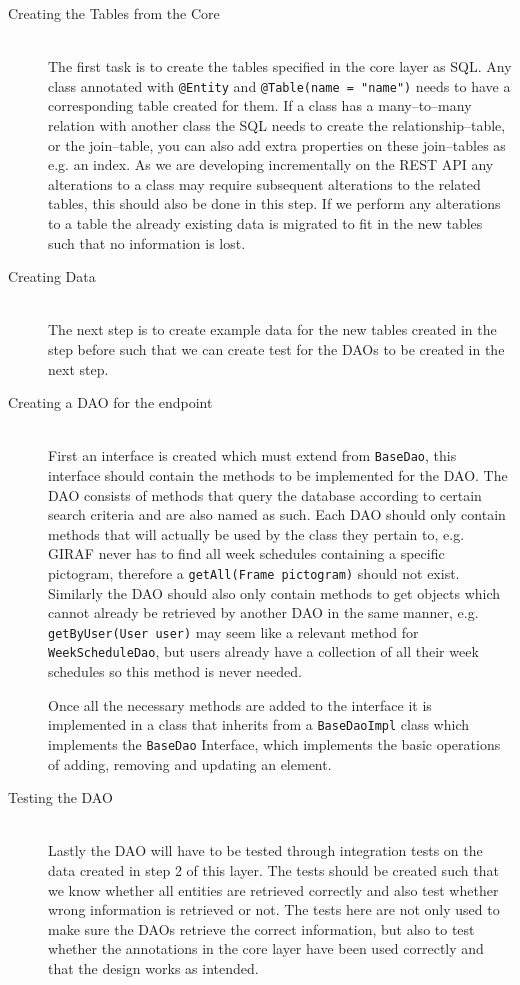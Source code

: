 \begin{description}
	\item[Creating the Tables from the Core] \hfill \\
	The first task is to create the tables specified in the core layer as SQL.
	Any class annotated with \texttt{@Entity} and \texttt{@Table(name = "name")} needs to have a corresponding table created for them.
	If a class has a many--to--many relation with another class the SQL needs to create the relationship--table, or the join--table, you can also add extra properties on these join--tables as e.g. an index.
	As we are developing incrementally on the REST API any alterations to a class may require subsequent alterations to the related tables, this should also be done in this step.
	If we perform any alterations to a table the already existing data is migrated to fit in the new tables such that no information is lost.
	\item[Creating Data] \hfill \\
	The next step is to create example data for the new tables created in the step before such that we can create test for the DAOs to be created in the next step.
	\item[Creating a DAO for the endpoint] \hfill \\
	First an interface is created which must extend from \texttt{BaseDao}, this interface should contain the methods to be implemented for the DAO.
	The DAO consists of methods that query the database according to certain search criteria and are also named as such.
	Each DAO should only contain methods that will actually be used by the class they pertain to, e.g. GIRAF never has to find all week schedules containing a specific pictogram, therefore a \texttt{getAll(Frame pictogram)} should not exist.
	Similarly the DAO should also only contain methods to get objects which cannot already be retrieved by another DAO in the same manner,	e.g. \texttt{getByUser(User user)} may seem like a relevant method for \texttt{WeekScheduleDao}, but users already have a collection of all their week schedules so this method is never needed.

	Once all the necessary methods are added to the interface it is implemented in a class that inherits from a \texttt{BaseDaoImpl} class which implements the \texttt{BaseDao} Interface, which implements the basic operations of adding, removing and updating an element.
	\item[Testing the DAO] \hfill \\
	Lastly the DAO will have to be tested through integration tests on the data created in step 2 of this layer.
	The tests should be created such that we know whether all entities are retrieved correctly and also test whether wrong information is retrieved or not.
	The tests here are not only used to make sure the DAOs retrieve the correct information, but also to test whether the annotations in the core layer have been used correctly and that the design works as intended.
\end{description}

